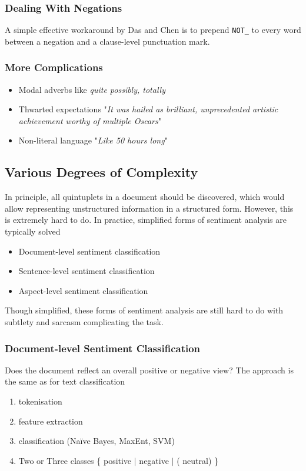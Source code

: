 \documentclass[11pt]{article}
\begin{document}
\subsubsection{Dealing With Negations}
A simple effective workaround by Das and Chen is to prepend \texttt{NOT\_} to every word between a negation and a clause-level punctuation mark.

\subsubsection{More Complications}
\begin{itemize}
	\item Modal adverbs like \emph{quite possibly, totally}
	\item Thwarted expectations "\emph{It was hailed as brilliant, unprecedented artistic achievement worthy of multiple Oscars}"
	\item Non-literal language "\emph{Like 50 hours long}"
\end{itemize}

\subsection{Various Degrees of Complexity}
In principle, all quintuplets in a document should be discovered, which would allow representing unstructured information in a structured form. However, this is extremely hard to do. In practice, simplified forms of sentiment analysis are typically solved
\begin{itemize}
	\item Document-level sentiment classification
	\item Sentence-level sentiment classification
	\item Aspect-level sentiment classification
\end{itemize}
Though simplified, these forms of sentiment analysis are still hard to do with subtlety and sarcasm complicating the task.

\subsubsection{Document-level Sentiment Classification}
Does the document reflect an overall {\color{Green3} positive} or {\color{Firebrick3} negative} view? The approach is the same as for text classification
\begin{enumerate}
	\item tokenisation
	\item feature extraction
	\item classification (Naïve Bayes, MaxEnt, SVM)
	\item Two or Three classes \{ {\color{Green3} positive} $\vert$ {\color{Firebrick3} negative} $\vert$ ({\color{gray} neutral}) \}
\end{enumerate}
\end{document}
